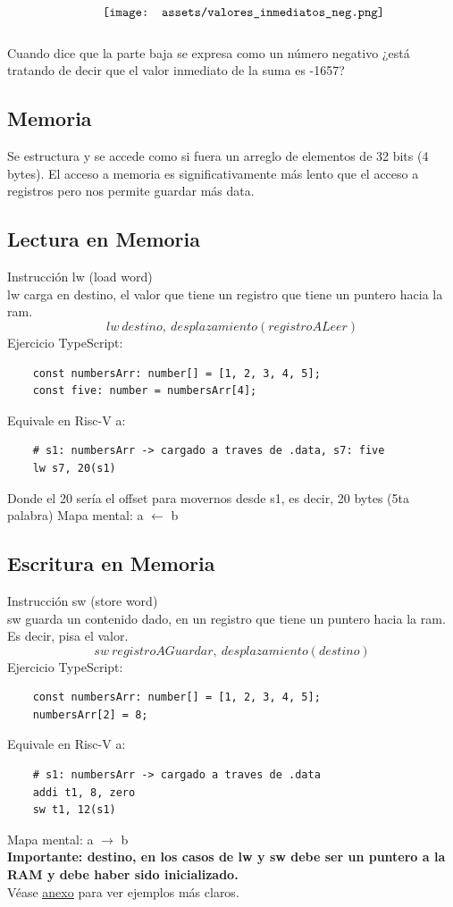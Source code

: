 \documentclass[10pt,a4paper]{article}
\begin{document}
\[\begin{minipage}[b]{0.6\textwidth}
    \texttt{[image: assets/valores\_inmediatos\_neg.png]}
    \label{fig:valores_neg}
\end{minipage}\]
Cuando dice que la parte baja se expresa como un número negativo ¿está tratando de decir que el valor inmediato de la suma es -1657?
\subsection*{Memoria}
Se estructura y se accede como si fuera un arreglo de elementos de 32 bits (4 bytes). El acceso a memoria es significativamente más lento que el acceso a registros pero nos permite guardar más data. \\
\subsection*{Lectura en Memoria} 
Instrucción lw (load word) \\ 
lw carga en destino, el valor que tiene un registro que tiene un puntero hacia la ram. \\ 
\[lw \ destino, \ desplazamiento(registroALeer)\]
Ejercicio TypeScript: 
\begin{lstlisting}
    const numbersArr: number[] = [1, 2, 3, 4, 5];
    const five: number = numbersArr[4];
\end{lstlisting}
Equivale en Risc-V a:
\begin{lstlisting}
    # s1: numbersArr -> cargado a traves de .data, s7: five
    lw s7, 20(s1)   
\end{lstlisting}
Donde el 20 sería el offset para movernos desde s1, es decir, 20 bytes (5ta palabra) 
Mapa mental: a \( \leftarrow \) b \\
\subsection*{Escritura en Memoria} 
Instrucción sw (store word) \\
sw guarda un contenido dado, en un registro que tiene un puntero hacia la ram. Es decir, pisa el valor.
\[sw \ registroAGuardar, \ desplazamiento(destino)\] 
Ejercicio TypeScript: 
\begin{lstlisting}
    const numbersArr: number[] = [1, 2, 3, 4, 5];
    numbersArr[2] = 8; 
\end{lstlisting}
Equivale en Risc-V a:
\begin{lstlisting}
    # s1: numbersArr -> cargado a traves de .data
    addi t1, 8, zero
    sw t1, 12(s1)   
\end{lstlisting}
Mapa mental: a \( \rightarrow \) b \\
\textbf{Importante: destino, en los casos de lw y sw debe ser un puntero a la RAM y debe haber sido inicializado.} \\
Véase \hyperref[subsec:punteros_ram_registros]{\underline{anexo}} para ver ejemplos más claros. 
\end{document}
